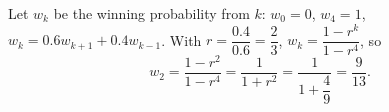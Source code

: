 Let $w_k$ be the winning probability from $k$: $w_0=0$, $w_4=1$, $w_k=0.6w_{k+1}+0.4w_{k-1}$. With $r=\dfrac{0.4}{0.6}=\dfrac23$, $w_k=\dfrac{1-r^k}{1-r^4}$, so
\[w_2=\dfrac{1-r^2}{1-r^4}=\dfrac1{1+r^2}=\dfrac1{1+\dfrac49}=\boxed{\dfrac9{13}}.\]
